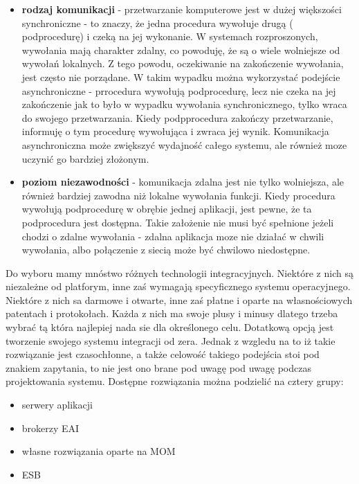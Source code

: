 \begin{itemize}
	\item \textbf{rodzaj komunikacji} - przetwarzanie komputerowe jest w dużej większości synchroniczne - to znaczy, że jedna procedura wywołuje drugą ( podprocedurę) i czeką na jej wykonanie. W systemach rozproszonych, wywołania mają charakter zdalny, co powoduję, że są o wiele wolniejsze od wywołań lokalnych. Z tego powodu, oczekiwanie na zakończenie wywołania, jest często nie porządane. W takim wypadku można wykorzystać podejście asynchroniczne - prrocedura wywołują podprocedurę, lecz nie czeka na jej zakończenie jak to było w wypadku wywołania synchronicznego, tylko wraca do swojego przetwarzania. Kiedy podpprocedura zakończy przetwarzanie, informuję o tym procedurę wywołująca i zwraca jej wynik. Komunikacja asynchroniczna może zwiększyć wydajność całego systemu, ale również moze uczynić go bardziej złożonym.
	\item \textbf{poziom niezawodności} - komunikacja zdalna jest nie tylko wolniejsza, ale również bardziej zawodna niż lokalne wywołania funkcji. Kiedy procedura wywołują podprocedurę w obrębie jednej aplikacji, jest pewne, że ta podprocedura jest dostępna. Takie założenie nie musi być spełnione jeżeli chodzi o zdalne wywołania - zdalna aplikacja moze nie działać w chwili wywołania, albo połączenie z siecią może być chwilowo niedostępne.
\end{itemize}

Do wyboru mamy mnóstwo różnych technologii integracyjnych. Niektóre z nich są niezależne od platforym, inne zaś wymagają specyficznego systemu operacyjnego. Niektóre z nich sa darmowe i otwarte, inne zaś płatne i oparte na własnościowych patentach i protokołach. Każda z nich ma swoje plusy i minusy dlatego trzeba wybrać tą która najlepiej nada sie dla określonego celu. Dotatkową opcją jest tworzenie swojego systemu integracji od zera. Jednak z wzgledu na to iż takie rozwiązanie jest czasochłonne, a także celowość takiego podejścia stoi pod znakiem zapytania, to nie jest ono brane pod uwagę pod uwagę podczas projektowania systemu. 
Dostępne rozwiązania można podzielić na cztery grupy: \cite{chappell2004}

\begin{itemize}
	\item serwery aplikacji
	\item brokerzy EAI
	\item własne rozwiązania oparte na  MOM
	\item ESB
\end{itemize}


